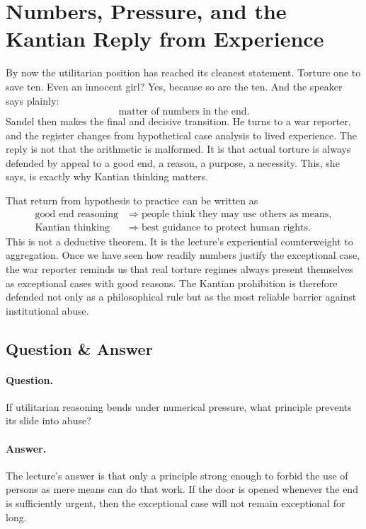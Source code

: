 \section{Numbers, Pressure, and the Kantian Reply from Experience}

By now the utilitarian position has reached its cleanest statement. Torture one to save ten. Even an innocent girl? Yes, because so are the ten. And the speaker says plainly:
\begin{equation}
\text{matter of numbers in the end}.
\end{equation}
Sandel then makes the final and decisive transition. He turns to a war reporter, and the register changes from hypothetical case analysis to lived experience. The reply is not that the arithmetic is malformed. It is that actual torture is always defended by appeal to a good end, a reason, a purpose, a necessity. This, she says, is exactly why Kantian thinking matters.

That return from hypothesis to practice can be written as
\begin{align}
\text{good end reasoning}
&\Longrightarrow
\text{people think they may use others as means},\\
\text{Kantian thinking}
&\Longrightarrow
\text{best guidance to protect human rights}.
\end{align}
This is not a deductive theorem. It is the lecture's experiential counterweight to aggregation. Once we have seen how readily numbers justify the exceptional case, the war reporter reminds us that real torture regimes always present themselves as exceptional cases with good reasons. The Kantian prohibition is therefore defended not only as a philosophical rule but as the most reliable barrier against institutional abuse.

\subsection{Question \& Answer}

\paragraph{Question.} If utilitarian reasoning bends under numerical pressure, what principle prevents its slide into abuse?

\paragraph{Answer.} The lecture's answer is that only a principle strong enough to forbid the use of persons as mere means can do that work. If the door is opened whenever the end is sufficiently urgent, then the exceptional case will not remain exceptional for long.

